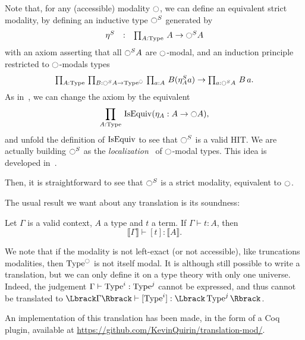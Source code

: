 \begin{rmq}
Note that, for any (accessible) modality $\ocircle$, we can define an equivalent
strict modality, by defining an inductive type $\ocircle^S$ generated by
\[ \left.
    \begin{array}{lll}
      \eta^S & : & \prod_{A:\operatorname{Type}}\, A \to \ocircle^S A \\
    \end{array}
    \right.
\]
with an axiom asserting that all $\ocircle^S A$ are $\ocircle$-modal, and
an induction principle restricted to $\ocircle$-modals types
{\large \[\textstyle{
  \prodD A \Type {%
    \prodD B {\modal^S A\to\Type^\modal}
      {\prodD a A {B(\eta^S_A a)} \to \prodD a {\modal^S A} {B\, a}%
      }%
    }%
}.\]}%
As in~\cite{shulman-localization}, we can change the axiom by the equivalent
\[
  \prod_{A:\operatorname{Type}}\, \operatorname{IsEquiv} (\eta_A : A \to \ocircle A),
\] and unfold the definition of $\operatorname{IsEquiv}$ to see that $\ocircle^S$ is a
valid HIT.
We are actually building $\ocircle^S$ as the {\em
  localization}~\cite[Definition 5.2.7.2]{lurie} of $\ocircle$-modal
types. This idea is developed in~\cite{shulman-mod-hits}.

Then, it is
straightforward to see that $\ocircle^S$ is a strict modality,
equivalent to $\ocircle$.
\end{rmq}

The usual result we want about any translation is its soundness:
\begin{prop}
  Let $\Gamma$ is a valid context, $A$ a type and $t$ a term.
  If $\Gamma \vdash t : A$, then 
  \[\Lbrack \Gamma \Rbrack \vdash [t] : \Lbrack A \Rbrack. \]
\end{prop}

\begin{rmq}
  We note that if the modality is not left-exact (or not accessible),
  like truncations
  modalities, then $\operatorname{Type}^{\ocircle}$ is not itself modal. It is although
  still possible to write a translation, but we can only define it on
  a type theory with only one universe. Indeed, the judgement $\Gamma
  \vdash \operatorname{Type}^i : \operatorname{Type}^j$ cannot be expressed, and thus cannot be
  translated to $\Lbrack \Gamma \Rbrack \vdash [\Type^i] :
  \Lbrack \Type^j \Rbrack$. 
\end{rmq}

An implementation of this translation has been made, in the form of a
Coq plugin, available at \url{https://github.com/KevinQuirin/translation-mod/}.

